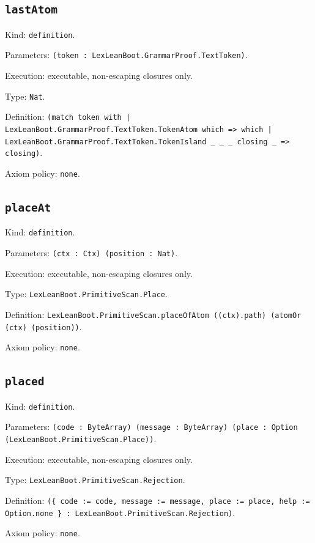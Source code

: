 \documentclass[11pt]{article}
\begin{document}
\subsection*{\texttt{lastAtom}}
\noindent Kind: \texttt{definition}.\par
\noindent Parameters: \texttt{(token : LexLeanBoot.GrammarProof.TextToken)}.\par
\noindent Execution: executable, non-escaping closures only.\par
\noindent Type: \texttt{Nat}.\par
\noindent Definition: \texttt{(match token with | LexLeanBoot.GrammarProof.TextToken.TokenAtom which => which | LexLeanBoot.GrammarProof.TextToken.TokenIsland \_ \_ \_ closing \_ => closing)}.\par
\noindent Axiom policy: \texttt{none}.\par
\subsection*{\texttt{placeAt}}
\noindent Kind: \texttt{definition}.\par
\noindent Parameters: \texttt{(ctx : Ctx) (position : Nat)}.\par
\noindent Execution: executable, non-escaping closures only.\par
\noindent Type: \texttt{LexLeanBoot.PrimitiveScan.Place}.\par
\noindent Definition: \texttt{LexLeanBoot.PrimitiveScan.placeOfAtom ((ctx).path) (atomOr (ctx) (position))}.\par
\noindent Axiom policy: \texttt{none}.\par
\subsection*{\texttt{placed}}
\noindent Kind: \texttt{definition}.\par
\noindent Parameters: \texttt{(code : ByteArray) (message : ByteArray) (place : Option (LexLeanBoot.PrimitiveScan.Place))}.\par
\noindent Execution: executable, non-escaping closures only.\par
\noindent Type: \texttt{LexLeanBoot.PrimitiveScan.Rejection}.\par
\noindent Definition: \texttt{(\{ code := code, message := message, place := place, help := Option.none \} : LexLeanBoot.PrimitiveScan.Rejection)}.\par
\noindent Axiom policy: \texttt{none}.\par
\end{document}
